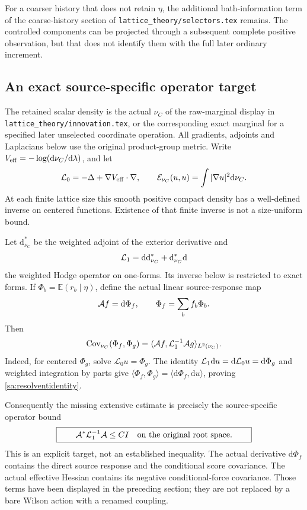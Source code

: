 \documentclass[11pt]{article}
\theoremstyle{definition}\newtheorem{definition}[theorem]{Definition}
\theoremstyle{remark}\newtheorem{remark}[theorem]{Remark}
\newcommand{\E}{\mathbb E}\newcommand{\Var}{\operatorname{Var}}
\newcommand{\Cov}{\operatorname{Cov}}\newcommand{\Tr}{\operatorname{Tr}}
\newcommand{\dd}{\mathrm d}\newcommand{\id}{\mathrm{id}}
\newcommand{\inner}[2]{\langle #1,#2\rangle}
\begin{document}
For a coarser history that does not retain $\eta$, the additional bath-information term of the coarse-history section of \texttt{lattice\_theory/selectors.tex} remains. The controlled components can be projected through a subsequent complete positive observation, but that does not identify them with the full later ordinary increment.

\subsection{An exact source-specific operator target}

The retained scalar density is the actual $\nu_C$ of the raw-marginal display in \texttt{lattice\_theory/innovation.tex}, or the corresponding exact marginal for a specified later unselected coordinate operation. All gradients, adjoints and Laplacians below use the original product-group metric. Write $V_{\rm eff}=-\log(\dd\nu_C/\dd\lambda)$, and let
\[
 {\cal L}_0=-\Delta+\nabla V_{\rm eff}\cdot\nabla,
 \qquad
 {\cal E}_{\nu_C}(u,u)=\int|\nabla u|^2\dd\nu_C.
\]
At each finite lattice size this smooth positive compact density has a well-defined inverse on centered functions. Existence of that finite inverse is not a size-uniform bound.

Let $\dd_{\nu_C}^*$ be the weighted adjoint of the exterior derivative and
\[
 {\cal L}_1=\dd\dd_{\nu_C}^*+\dd_{\nu_C}^*\dd
\]
the weighted Hodge operator on one-forms. Its inverse below is restricted to exact forms. If $\Phi_b=\E(r_b\mid\eta)$, define the actual linear source-response map
\[
 {\cal A}f=\dd\Phi_f,\qquad \Phi_f=\sum_bf_b\Phi_b.
\]
Then
\begin{equation}
 \Cov_{\nu_C}(\Phi_f,\Phi_g)
 =\inner{{\cal A}f}{{\cal L}_1^{-1}{\cal A}g}_{L^2(\nu_C)}.
 \label{sa:resolventidentity}
\end{equation}
Indeed, for centered $\Phi_g$, solve $\mathcal L_0u=\Phi_g$. The identity
$\mathcal L_1\dd u=\dd{\cal L}_0u=\dd\Phi_g$ and weighted integration by parts give
$\inner{\Phi_f}{\Phi_g}=\inner{\dd\Phi_f}{\dd u}$, proving \eqref{sa:resolventidentity}.

Consequently the missing extensive estimate is precisely the source-specific operator bound
\begin{equation}
 \boxed{\qquad {\cal A}^*{\cal L}_1^{-1}{\cal A}\le C I
 \quad\hbox{on the original root space.}\qquad}
 \label{sa:missingoperator}
\end{equation}
This is an explicit target, not an established inequality. The actual derivative $\dd\Phi_f$ contains the direct source response and the conditional score covariance. The actual effective Hessian contains its negative conditional-force covariance. Those terms have been displayed in the preceding section; they are not replaced by a bare Wilson action with a renamed coupling.
\end{document}
